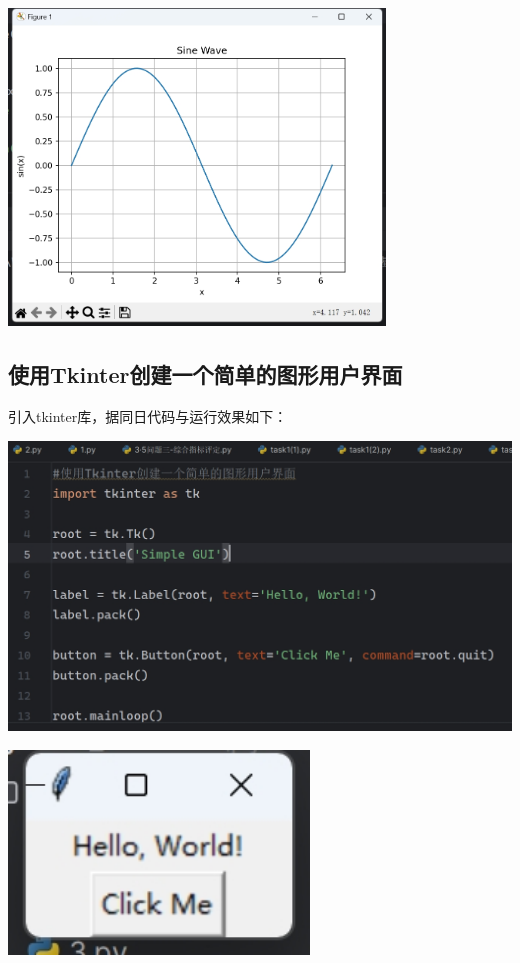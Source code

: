 \documentclass[UTF8,a4paper]{ctexart}
\begin{document}
\begin{sloppypar}
	\includegraphics[width = 10cm]{22.2}
	
	\subsection{使用Tkinter创建一个简单的图形用户界面}
	引入tkinter库，据同日代码与运行效果如下：
	
	\includegraphics[width = 14cm]{23.1}
	
	\includegraphics[width = 8cm]{23.2}
	

\end{sloppypar}
\end{document}
